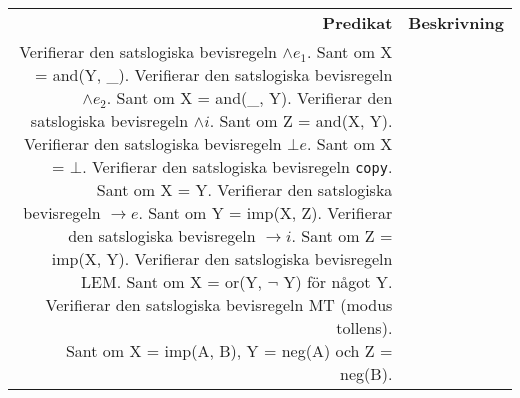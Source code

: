 \documentclass[a4paper,10.5pt]{article}
\newcommand{\predrow}[3]{
    \pbox[t]{20cm}{\texttt{#1}} & \pbox[t]{20cm}{\texttt{#2}\\ \raisebox{-0.1cm}{\pbox[t]{20cm}{#3}} \vspace{0.33cm}}\\ 
}
\begin{document}
\begin{tabular}{r l}
\textbf{Predikat} & \textbf{Beskrivning}\\
\predrow{andel1/2}{andel1(?X, ?Y)}{Verifierar den satslogiska bevisregeln $\land e_1$.\\ Sant om X = and(Y, \_).}
\predrow{andel2/2}{andel2(?X, ?Y)}{Verifierar den satslogiska bevisregeln $\land e_2$.\\ Sant om X = and(\_, Y).}
\predrow{andint/3}{andint(?X, ?Y, ?Z)}{Verifierar den satslogiska bevisregeln $\land i$.\\ Sant om Z = and(X, Y).}
\predrow{contel/2}{contel(?X, ?Y)}{Verifierar den satslogiska bevisregeln $\bot e$.\\ Sant om X = $\bot$.}
\predrow{copy/2}{copy(?X, ?Y)}{Verifierar den satslogiska bevisregeln \texttt{copy}.\\ Sant om X = Y.}
\predrow{impel/3}{impel(?X, ?Y, ?Z)}{Verifierar den satslogiska bevisregeln $\rightarrow e$.\\ Sant om Y = imp(X, Z).}
\predrow{impint/3}{impint(?X, ?Y, ?Z)}{Verifierar den satslogiska bevisregeln $\rightarrow i$.\\ Sant om Z = imp(X, Y).}
\predrow{lem/1}{lem(?X)}{Verifierar den satslogiska bevisregeln LEM.\\ Sant om X = or(Y, $\lnot$ Y) för något Y.}
\predrow{mt/3}{mt(?X, ?Y, ?Z)}{Verifierar den satslogiska bevisregeln MT (modus tollens).\\ Sant om X = imp(A, B), Y = neg(A) och Z = neg(B).}

\end{tabular}
\end{document}
